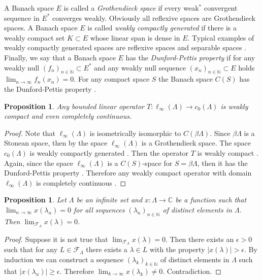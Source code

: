 \documentclass[12pt]{article}
\newtheorem{proposition}[theorem]{Proposition}
\begin{document}
A Banach space $E$ is called a \textit{Grothendieck space} if every weak$^*$ convergent sequence in $E^*$ converges weakly. Obviously all reflexive spaces are Grothendieck spaces. A Banach space $E$ is called \textit{weakly compactly generated} if there is a weakly compact set $K\subset E$ whose linear span is dense in $E$. Typical examples of weakly compactly generated spaces are reflexive spaces and separable spaces \cite[paragraph 13.1]{FabHabBanSpTh}. Finally, we say that a Banach space $E$ has the \textit{Dunford-Pettis property} if for any weakly null $(f_n)_{n\in\mathbb{N}}\subset E^*$ and any weakly null sequence $(x_n)_{n\in\mathbb{N}}\subset E$ holds $\lim_{n\to\infty} f_n(x_n)=0$. For any compact space $S$ the Banach space $C(S)$ has the Dunford-Pettis property \cite{DunfPetLinOpSumFunc}.

\begin{proposition}\label{OpLInfc0CompContWeakComp} Any bounded linear operator $T:\ell_\infty(\Lambda)\to c_0(\Lambda)$ is weakly compact and even completely continuous.
\end{proposition}
\begin{proof} Note that $\ell_\infty(\Lambda)$ is isometrically isomorphic to $C(\beta\Lambda)$. Since $\beta\Lambda$ is a Stonean space, then by \cite[theorem 9, p. 168]{GrothApplFabilCompCK} the space $\ell_\infty(\Lambda)$ is a Grothendieck space. The space $c_0(\Lambda)$ is weakly compactly generated \cite[paragraph 13.1 example (iii)]{FabHabBanSpTh}. Then the operator $T$ is weakly compact \cite[exercise 13.33]{FabHabBanSpTh}. Again, since the space $\ell_\infty(\Lambda)$ is a $C(S)$-space for $S=\beta\Lambda$, then it has the Dunford-Pettis property \cite[theorem 13.43]{FabHabBanSpTh}. Therefore any weakly compact operator with domain $\ell_\infty(\Lambda)$ is completely continuous \cite[proposition 13.42]{FabHabBanSpTh}.
\end{proof}

\begin{proposition}\label{FrechFiltConvCharac} Let $\Lambda$ be an infinite set and $x:\Lambda\to\mathbb{C}$ be a function such that $\lim_{n\to\infty} x(\lambda_n)=0$ for all sequences $(\lambda_n)_{n\in\mathbb{N}}$ of distinct elements in $\Lambda$. Then $\lim_{\mathcal{F}_{\Lambda}}x(\lambda)=0$.
\end{proposition}
\begin{proof} Suppose it is not true that $\lim_{\mathcal{F}_{\Lambda}}x(\lambda)=0$. Then there exists an $\epsilon > 0$ such that for any $L\in\mathcal{F}_{\Lambda}$ there exists a $\lambda\in L$ with the property $|x(\lambda)|>\epsilon$. By induction we can construct a sequence $(\lambda_k)_{k\in\mathbb{N}}$ of distinct elements in $\Lambda$ such that $|x(\lambda_n)|\geq \epsilon$. Therefore $\lim_{k\to\infty} x(\lambda_k)\neq 0$. Contradiction.
\end{proof}
\end{document}
